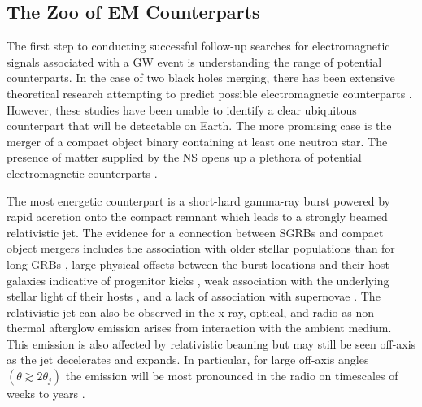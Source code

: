 \subsection{The Zoo of EM Counterparts}
\label{sec:intro_counterparts}
The first step to conducting successful follow-up searches for electromagnetic signals associated with a GW event is understanding the range of potential counterparts. In the case of two black holes merging, there has been extensive theoretical research attempting to predict possible electromagnetic counterparts \citep[see e.g.,][]{Krolik2010,Loeb2016,Perna+16,DOrazioLoeb17,Kelly+17}. However, these studies have been unable to identify a clear ubiquitous counterpart that will be detectable on Earth. The more promising case is the merger of a compact object binary containing at least one neutron star. The presence of matter supplied by the NS opens up a plethora of potential electromagnetic counterparts \citep[see e.g.,][]{MetzgerBerger12,Piran+13}.

The most energetic counterpart is a short-hard gamma-ray burst \citep[SGRB; e.g.,][]{Paczynski1986,Narayan+92,Berger2014} powered by rapid accretion onto the compact remnant which leads to a strongly beamed relativistic jet. The evidence for a connection between SGRBs and compact object mergers includes the association with older stellar populations than for long GRBs \citep{Berger+05,Bloom+06,Berger2011,Fong+11,Fong+13,Fong+15}, large physical offsets between the burst locations and their host galaxies indicative of progenitor kicks \citep{Fong+10, FongBerger13,Fong+15}, weak association with the underlying stellar light of their hosts \citep{Fong+10, FongBerger13,Fong+15}, and a lack of association with supernovae \citep{Fox+05,Soderberg+06,Berger2010,FongBerger13,Berger2014,Fong+15}. The relativistic jet can also be observed in the x-ray, optical, and radio as non-thermal afterglow emission arises from interaction with the ambient medium. This emission is also affected by relativistic beaming but may still be seen off-axis as the jet decelerates and expands. In particular, for large off-axis angles $(\theta\gtrsim 2 \theta_j)$ the emission will be most pronounced in the radio on timescales of weeks to years  \citep{NakarPiran11,MetzgerBerger12}.

